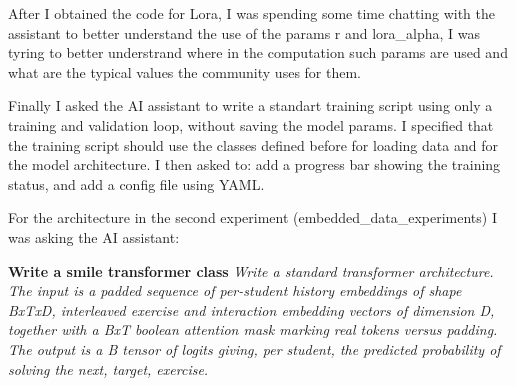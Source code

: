 \documentclass[10pt]{article}
\begin{document}
After I obtained the code for Lora, I was spending some time chatting with the assistant to better understand the use of the params r
and lora\_alpha, I was tyring to better understrand where in the computation such params are used and what are the typical values
the community uses for them.

Finally I asked the AI assistant to write a standart training script using only a training and validation loop, without saving the model params.
I specified that the training script should use the classes defined before for loading data and for the model architecture.
I then asked to: add a progress bar showing the training status, and add a config file using YAML.

For the architecture in the second experiment (embedded\_data\_experiments) I was asking the AI assistant:

\medskip\noindent\textbf{Write a smile transformer class}
\textit{Write a standard transformer architecture. The input is a padded sequence of per-student history 
embeddings of shape BxTxD, interleaved exercise and interaction embedding vectors of dimension D, together with a BxT boolean attention 
mask marking real tokens versus padding. The output is a B tensor of logits giving, per student, the predicted probability of solving the next, target, exercise.}
\end{document}
